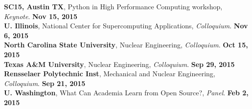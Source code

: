 \documentclass[margin,line]{resume}
\begin{document}
\begin{resume}
      \textbf{SC15, Austin TX}, Python in High Performance Computing workshop, \emph{Keynote}.     \hfill\textbf{Nov 15, 2015}\\
      \textbf{U. Illinois}, National Center for Supercomputing Applications, \emph{Colloquium}.    \hfill\textbf{Nov 6, 2015}\\
      \textbf{North Carolina State University}, Nuclear Engineering, \emph{Colloquium}.            \hfill\textbf{Oct 15, 2015}\\
      \textbf{Texas A\&M University}, Nuclear Engineering, \emph{Colloquium}.                      \hfill\textbf{ Sep 29, 2015}\\
      \textbf{Rensselaer Polytechnic Inst}, Mechanical and Nuclear Engineering, \emph{Colloquium}. \hfill\textbf{Sep 21, 2015}\\
      \textbf{U. Washington}, What Can Academia Learn from Open Source?, \emph{Panel}.   \hfill\textbf{Feb 2, 2015}


\end{resume}
\end{document}
